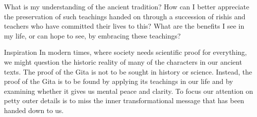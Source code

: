 



\newpage
\begin{mananam}{} 
\mananamtext What is my understanding of the ancient tradition? How can I better appreciate the preservation of such teachings handed on through a succession of rishis and teachers who have committed their lives to this? What are the benefits I see in my life, or can hope to see, by embracing these teachings?  
\end{mananam}
\WritingHand{}
\begin{inspiration}{\mananamfont Inspiration}
\mananamtext In modern times, where society needs scientific proof for everything, we might question the historic reality of many of the characters in our ancient texts. The proof of the Gita is not to be sought in history or science. Instead, the proof of the Gita is to be found by applying its teachings in our life and by examining whether it gives us mental peace and clarity. To focus our attention on petty outer details is to miss the inner transformational message that has been handed down to us.
\end{inspiration}
\newpage

